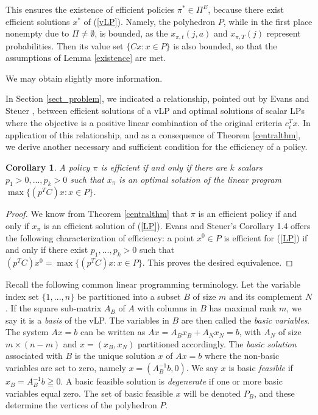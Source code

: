 \documentclass{article}
\newtheorem{corollary}[theorem]{Corollary}
\theoremstyle{definition}
\numberwithin{equation}{section}
\begin{document}
{%


This ensures the existence of efficient policies $\pi^*\in \Pi^E$, because 
there exist efficient solutions $x^*$ of (\ref{vLP}).
Namely,
the polyhedron
$P$, while in the first place nonempty due to  $\Pi \not=\emptyset$, 
is bounded, as the $x_{\pi,t}(j,a)$ and $x_{\pi,T}(j)$ represent probabilities. Then its value set $\{Cx: x\in P\}$ is also bounded, so that the assumptions of Lemma \ref{existence} are met. 

We may obtain slightly more information.


In Section \ref{sect_problem}, we indicated a relationship, pointed out by Evans and Steuer \cite{7}, between efficient solutions of a vLP and optimal solutions
of scalar LPs where the objective is a positive linear combination of the original criteria $c_i^Tx$. In application of this relationship, and as a consequence of Theorem \ref{centralthm}, we derive another necessary and sufficient condition for the efficiency of a policy.

\begin{corollary}
\label{cor3}
A policy $\pi$ is efficient if and only if there are $k$ %
scalars $p_1>0, ..., p_k>0$ such that $x_{\pi}$ is an optimal solution of the linear program $\max\{(p^{T}C)x: x \in P\}$.
\end{corollary}

\begin{proof}
We know from Theorem \ref{centralthm} that $\pi$ is an efficient policy if and only if $x_{\pi}$ is an efficient solution of (\ref{LP}). Evans and Steuer's Corollary 1.4 offers the following characterization of efficiency: a point $x^{0} \in P$ is efficient for (\ref{LP}) if and only if there exist $p_1, ..., p_k > 0$ such that $(p^{T}C)x^{0} = \max\{(p^{T}C)x: x \in P\}$. This proves the desired equivalence. 
\end{proof}

Recall the following common linear programming terminology. Let the variable index set $\{1, ..., n\}$ be 
partitioned into a subset $B$ of size $m$ and its complement $N$. 
If the square sub-matrix $A_B$ of $A$ with columns in $B$ has maximal rank $m$, we say it is a \textit{basis} of the vLP. The variables in $B$ are then called the \textit{basic variables}. The system $Ax = b$ can be written as $Ax = A_Bx_B + A_Nx_N = b$, with $A_N$ of size $m \times (n-m)$ and $x=(x_B,x_N)$ partitioned accordingly. The \textit{basic solution} associated with $B$ is the unique solution $x$ of $Ax = b$ where the non-basic variables are set to zero, namely $x = (A_B^{-1}b, 0)$. We say $x$ is basic \textit{feasible} if $x_B = A_B^{-1}b \geqq 0$. A basic feasible solution is \textit{degenerate} if one or more basic variables equal zero. The set of basic feasible $x$ will be denoted $P_B$,
and these determine the vertices of the polyhedron $P$.} 
\end{document}
